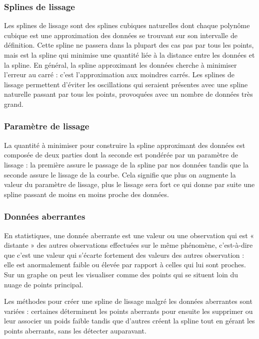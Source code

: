 \documentclass[a4paper,12pt]{article} %
\begin{document}
\subsubsection*{Splines de lissage}
Les splines de lissage sont des splines cubiques naturelles dont chaque polynôme cubique est une approximation des données se trouvant sur son intervalle de définition. Cette spline ne passera dans la plupart des cas pas par tous les points, mais est la spline qui minimise une quantité liée à la distance entre les données et la spline. En général, la spline approximant les données cherche à minimiser l'erreur au carré : c'est l'approximation aux moindres carrés. 
Les splines de lissage permettent d'éviter les oscillations qui seraient présentes avec une spline naturelle passant par tous les points, provoquées avec un nombre de données très grand.

\subsubsection*{Paramètre de lissage}
La quantité à minimiser pour construire la spline approximant des données est composée de deux parties dont la seconde est pondérée par un paramètre de lissage : la première assure le passage de la spline par nos données tandis que la seconde assure le lissage de la courbe. Cela signifie que plus on augmente la valeur du paramètre de lissage, plus le lissage sera fort ce qui donne par suite une spline passant de moins en moins proche des données.

\subsubsection*{Données aberrantes}

En statistiques, une donnée aberrante est une valeur ou une observation qui est « distante » des autres observations effectuées sur le même phénomène, c'est-à-dire que c’est une valeur qui s'écarte fortement des valeurs des autres observation : elle est anormalement faible ou élevée par rapport à celles qui lui sont proches. Sur un graphe on peut les visualiser comme des points qui se situent loin du nuage de points principal.

Les  méthodes pour créer une spline de lissage malgré les données aberrantes sont variées : certaines déterminent les points aberrants pour ensuite les supprimer ou leur associer un poids faible tandis que d'autres créent la spline tout en gérant les points aberrants, sans les détecter auparavant. 
\end{document}
